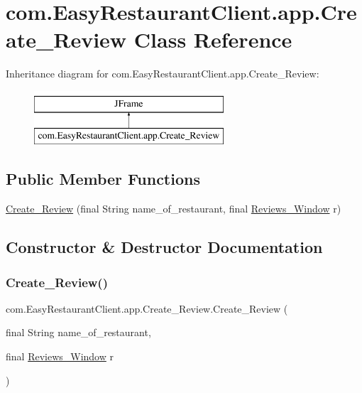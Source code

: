\hypertarget{classcom_1_1_easy_restaurant_client_1_1app_1_1_create___review}{}\section{com.\+Easy\+Restaurant\+Client.\+app.\+Create\+\_\+\+Review Class Reference}
\label{classcom_1_1_easy_restaurant_client_1_1app_1_1_create___review}
Inheritance diagram for com.\+Easy\+Restaurant\+Client.\+app.\+Create\+\_\+\+Review\+:\begin{figure}[H]
\begin{center}
\leavevmode
\includegraphics[height=2.000000cm]{classcom_1_1_easy_restaurant_client_1_1app_1_1_create___review}
\end{center}
\end{figure}
\subsection*{Public Member Functions}
\begin{DoxyCompactItemize}
\item 
\mbox{\hyperlink{classcom_1_1_easy_restaurant_client_1_1app_1_1_create___review_a1eff23ddd10fb6d04e5a366b3d51e6cf}{Create\+\_\+\+Review}} (final String name\+\_\+of\+\_\+restaurant, final \mbox{\hyperlink{classcom_1_1_easy_restaurant_client_1_1app_1_1_reviews___window}{Reviews\+\_\+\+Window}} r)
\end{DoxyCompactItemize}


\subsection{Constructor \& Destructor Documentation}
\mbox{\label{classcom_1_1_easy_restaurant_client_1_1app_1_1_create___review_a1eff23ddd10fb6d04e5a366b3d51e6cf}} 
\subsubsection{\texorpdfstring{Create\_Review()}{Create\_Review()}}
{\footnotesize\ttfamily com.\+Easy\+Restaurant\+Client.\+app.\+Create\+\_\+\+Review.\+Create\+\_\+\+Review (\begin{DoxyParamCaption}\item[{final String}]{name\+\_\+of\+\_\+restaurant,  }\item[{final \mbox{\hyperlink{classcom_1_1_easy_restaurant_client_1_1app_1_1_reviews___window}{Reviews\+\_\+\+Window}}}]{r }\end{DoxyParamCaption})}

